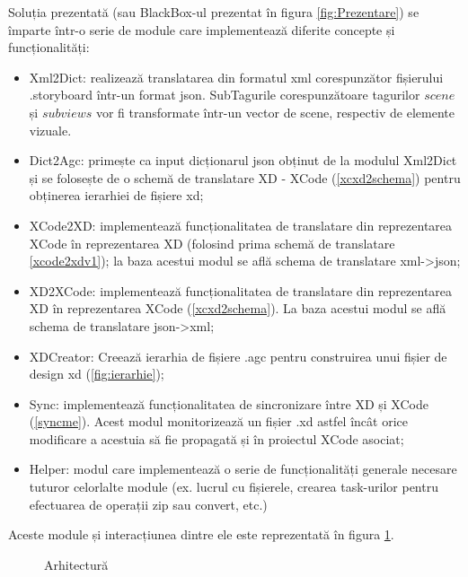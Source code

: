 Soluția prezentată (sau BlackBox-ul prezentat în figura \ref{fig:Prezentare}) se împarte într-o serie de module care implementează diferite concepte și funcționalități:
\begin{itemize} 
\item Xml2Dict: realizează translatarea din formatul xml corespunzător fișierului .storyboard într-un format json. SubTagurile corespunzătoare tagurilor $scene$ și $subviews$ vor fi transformate într-un vector de scene, respectiv de elemente vizuale.
\item Dict2Agc: primește ca input dicționarul json obținut de la modulul Xml2Dict și se folosește de o schemă de translatare XD - XCode (\ref{xcxd2schema}) pentru obținerea ierarhiei de fișiere xd;
\item XCode2XD: implementează funcționalitatea de translatare din reprezentarea XCode în reprezentarea XD (folosind prima schemă de translatare \ref{xcode2xdv1}); la baza acestui modul se află schema de translatare xml->json;
\item XD2XCode: implementează funcționalitatea de translatare din reprezentarea XD în reprezentarea XCode (\ref{xcxd2schema}). La baza acestui modul se află schema de translatare json->xml;
\item XDCreator: Creează ierarhia de fișiere .agc pentru construirea unui fișier de design xd (\ref{fig:ierarhie});
\item Sync: implementează funcționalitatea de sincronizare între XD și XCode (\ref{syncme}). Acest modul monitorizează un fișier .xd astfel încât orice modificare a acestuia să fie propagată și în proiectul XCode asociat;
\item Helper: modul care implementează o serie de funcționalități generale necesare tuturor celorlalte module (ex. lucrul cu fișierele, crearea task-urilor pentru efectuarea de operații zip sau convert, etc.)
\end{itemize}

Aceste module și interacțiunea dintre ele este reprezentată în figura \ref{fig:Arhitectura}.

\begin{figure}[!htbp]
\centering
{}
\caption{Arhitectură} \label{fig:Arhitectura}
\end{figure}

